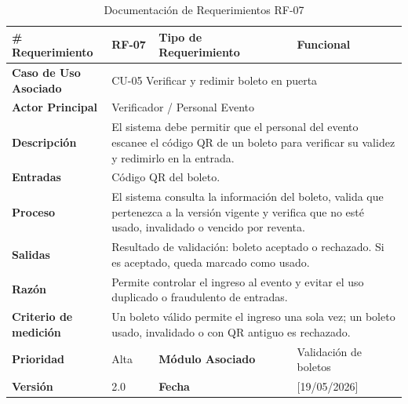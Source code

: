 \documentclass[12pt,letterpaper]{article}
\begin{document}

\begin{table}[H]
\centering
\scriptsize
\renewcommand{\arraystretch}{1.05}
\setlength{\tabcolsep}{3pt}

\newlength{\anchoceldaRFsiete}
\setlength{\anchoceldaRFsiete}{\dimexpr\textwidth-2.7cm-8\tabcolsep-5\arrayrulewidth\relax}

\begin{tabularx}{\textwidth}{|p{2.7cm}|X|p{2.8cm}|X|}
\hline
\textbf{\# Requerimiento} & RF-07 & \textbf{Tipo de Requerimiento} & Funcional \\ \hline

\textbf{Caso de Uso Asociado} & 
\multicolumn{3}{p{\anchoceldaRFsiete}|}{CU-05 Verificar y redimir boleto en puerta} \\ \hline

\textbf{Actor Principal} & 
\multicolumn{3}{p{\anchoceldaRFsiete}|}{Verificador / Personal Evento} \\ \hline

\textbf{Descripción} & 
\multicolumn{3}{p{\anchoceldaRFsiete}|}{El sistema debe permitir que el personal del evento escanee el código QR de un boleto para verificar su validez y redimirlo en la entrada.} \\ \hline

\textbf{Entradas} & 
\multicolumn{3}{p{\anchoceldaRFsiete}|}{Código QR del boleto.} \\ \hline

\textbf{Proceso} & 
\multicolumn{3}{p{\anchoceldaRFsiete}|}{El sistema consulta la información del boleto, valida que pertenezca a la versión vigente y verifica que no esté usado, invalidado o vencido por reventa.} \\ \hline

\textbf{Salidas} & 
\multicolumn{3}{p{\anchoceldaRFsiete}|}{Resultado de validación: boleto aceptado o rechazado. Si es aceptado, queda marcado como usado.} \\ \hline

\textbf{Razón} & 
\multicolumn{3}{p{\anchoceldaRFsiete}|}{Permite controlar el ingreso al evento y evitar el uso duplicado o fraudulento de entradas.} \\ \hline

\textbf{Criterio de medición} & 
\multicolumn{3}{p{\anchoceldaRFsiete}|}{Un boleto válido permite el ingreso una sola vez; un boleto usado, invalidado o con QR antiguo es rechazado.} \\ \hline

\textbf{Prioridad} & Alta & \textbf{Módulo Asociado} & Validación de boletos \\ \hline

\textbf{Versión} & 2.0 & \textbf{Fecha} & [19/05/2026] \\ \hline

\end{tabularx}

\caption{Documentación de Requerimientos RF-07}
\label{tab:documentacion_requerimientos_rf07}
\normalsize
\end{table}
\end{document}
